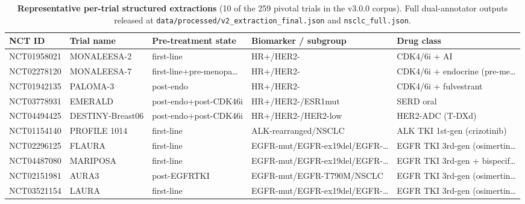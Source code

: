 \begin{table}[H]
\centering
\caption{\textbf{Representative per-trial structured extractions} (10 of the 259 pivotal trials in the v3.0.0 corpus). Full dual-annotator outputs released at \texttt{data/processed/v2\_extraction\_final.json} and \texttt{nsclc\_full.json}.}
\label{tab:S2}
\footnotesize
\begin{tabular}{@{}p{}p{}p{}p{}p{}@{}}
\toprule
NCT ID & Trial name & Pre-treatment state & Biomarker / subgroup & Drug class \\
\midrule
NCT01958021 & MONALEESA-2 & first-line & HR+/HER2- & CDK4/6i + AI \\
NCT02278120 & MONALEESA-7 & first-line+pre-menopa… & HR+/HER2- & CDK4/6i + endocrine (pre-me… \\
NCT01942135 & PALOMA-3 & post-endo & HR+/HER2- & CDK4/6i + fulvestrant \\
NCT03778931 & EMERALD & post-endo+post-CDK46i & HR+/HER2-/ESR1mut & SERD oral \\
NCT04494425 & DESTINY-Breast06 & post-endo+post-CDK46i & HR+/HER2-/HER2-low & HER2-ADC (T-DXd) \\
NCT01154140 & PROFILE 1014 & first-line & ALK-rearranged/NSCLC & ALK TKI 1st-gen (crizotinib) \\
NCT02296125 & FLAURA & first-line & EGFR-mut/EGFR-ex19del/EGFR-… & EGFR TKI 3rd-gen (osimertin… \\
NCT04487080 & MARIPOSA & first-line & EGFR-mut/EGFR-ex19del/EGFR-… & EGFR TKI 3rd-gen + bispecif… \\
NCT02151981 & AURA3 & post-EGFRTKI & EGFR-mut/EGFR-T790M/NSCLC & EGFR TKI 3rd-gen (osimertin… \\
NCT03521154 & LAURA & first-line & EGFR-mut/EGFR-ex19del/EGFR-… & EGFR TKI 3rd-gen (osimertin… \\
\bottomrule
\end{tabular}
\end{table}
